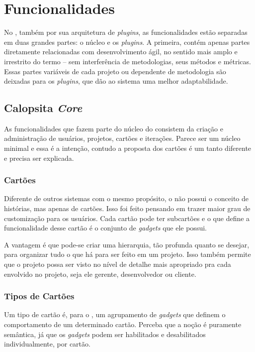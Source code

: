\section{Funcionalidades}

No \calopsita{}, também por sua arquitetura de \textit{plugins}, as funcionalidades estão separadas em duas grandes partes: o núcleo e os \textit{plugins}. A primeira, contém apenas partes diretamente relacionadas com desenvolvimento ágil, no sentido mais amplo e irrestrito do termo -- sem interferência de metodologias, seus métodos e métricas. Essas partes variáveis de cada projeto ou dependente de metodologia são deixadas para os \textit{plugins}, que dão ao sistema uma melhor adaptabilidade.

\subsection{Calopsita \textit{Core}}

As funcionalidades que fazem parte do núcleo do \calopsita{} consistem da criação e administração de usuários, projetos, cartões e iterações. Parece ser um núcleo minimal e essa é a intenção, contudo a proposta dos cartões é um tanto diferente e precisa ser explicada.

\subsubsection*{Cartões}

Diferente de outros sistemas com o mesmo propósito, o \calopsita{} não possui o conceito de histórias, mas apenas de cartões. Isso foi feito pensando em trazer maior grau de customização para os usuários. Cada cartão pode ter subcartões e o que define a funcionalidade desse cartão é o conjunto de \textit{gadgets} que ele possui. 

A vantagem é que pode-se criar uma hierarquia, tão profunda quanto se desejar, para organizar tudo o que há para ser feito em um projeto. Isso também permite que o projeto possa ser visto no nível de detalhe mais apropriado pra cada envolvido no projeto, seja ele gerente, desenvolvedor ou cliente. 

\subsubsection*{Tipos de Cartões}

Um tipo de cartão é, para o \calopsita{}, um agrupamento de \textit{gadgets} que definem o comportamento de um determinado cartão. Perceba que a noção é puramente semântica, já que os \textit{gadgets} podem ser habilitados e desabilitados individualmente, por cartão.

